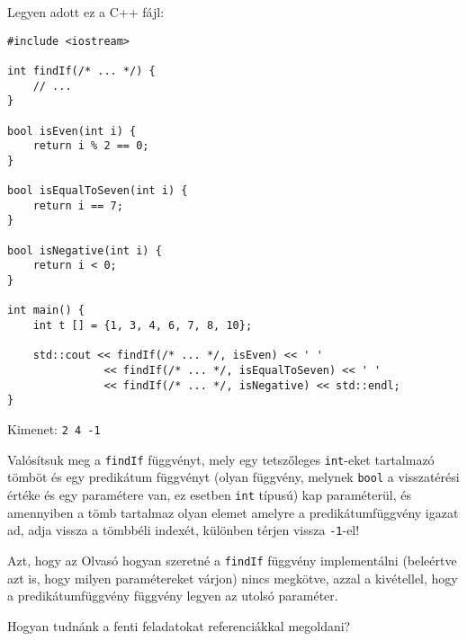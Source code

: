 \documentclass[../exercise_book/exercise_book.tex]{subfiles}
\begin{document}
	\begin{exercise}
		Legyen adott ez a C++ fájl:
		
		\smallskip
		\begin{lstlisting}
#include <iostream>

int findIf(/* ... */) {
	// ...
}

bool isEven(int i) {
	return i % 2 == 0;
}

bool isEqualToSeven(int i) {
	return i == 7;
}

bool isNegative(int i) {
	return i < 0;
}

int main() {
	int t [] = {1, 3, 4, 6, 7, 8, 10};
	
	std::cout << findIf(/* ... */, isEven) << ' '
	           << findIf(/* ... */, isEqualToSeven) << ' '
	           << findIf(/* ... */, isNegative) << std::endl;
}
		\end{lstlisting}
		Kimenet: \texttt{2 4 -1}
		
		\smallskip
		Valósítsuk meg a \texttt{findIf} függvényt, mely egy tetszőleges \texttt{int}-eket tartalmazó tömböt és egy predikátum függvényt (olyan függvény, melynek \texttt{bool} a visszatérési értéke és egy paramétere van, ez esetben \texttt{int} típusú) kap paraméterül, és amennyiben a tömb tartalmaz olyan elemet amelyre a predikátumfüggvény igazat ad, adja vissza a tömbbéli indexét, különben térjen vissza \texttt{-1}-el!
		
		Azt, hogy az Olvasó hogyan szeretné a \texttt{findIf} függvény implementálni (beleértve azt is, hogy milyen paramétereket várjon) nincs megkötve, azzal a kivétellel, hogy a predikátumfüggvény függvény legyen az utolsó paraméter.
	\end{exercise}
	\begin{exercise}
		Hogyan tudnánk a fenti feladatokat referenciákkal megoldani?
	\end{exercise}
\end{document}
